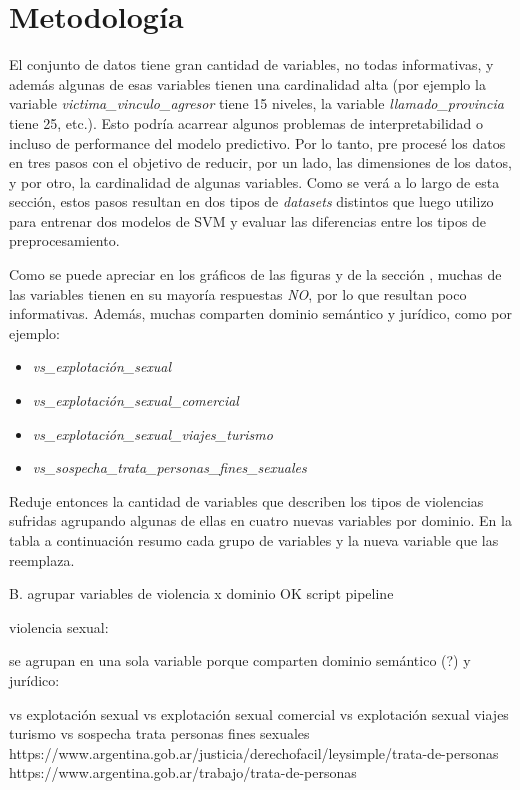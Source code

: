 \documentclass[10 pt]{article}
\begin{document}
\section*{Metodología}\label{met}

El conjunto de datos tiene gran cantidad de variables, no todas informativas, y además algunas de esas variables tienen una cardinalidad alta (por ejemplo la variable \textit{victima\_vinculo\_agresor} tiene 15 niveles, la variable \textit{llamado\_provincia} tiene 25, etc.). Esto podría acarrear algunos problemas de interpretabilidad o incluso de performance del modelo predictivo. Por lo tanto, pre procesé los datos en tres pasos con el objetivo de reducir, por un lado, las dimensiones de los datos, y por otro, la cardinalidad de algunas variables. Como se verá a lo largo de esta sección, estos pasos resultan en dos tipos de \textit{datasets} distintos que luego utilizo para entrenar dos modelos de SVM y evaluar las diferencias entre los tipos de preprocesamiento.

Como se puede apreciar en los gráficos de las figuras  y  de la sección , muchas de las variables tienen en su mayoría respuestas \textit{NO}, por lo que resultan poco informativas. Además, muchas comparten dominio semántico y jurídico, como por ejemplo:  
\begin{itemize}
\item \textit{vs\_explotación\_sexual}
\item \textit{vs\_explotación\_sexual\_comercial}
\item \textit{vs\_explotación\_sexual\_viajes\_turismo}
\item \textit{vs\_sospecha\_trata\_personas\_fines\_sexuales}
\end{itemize}

Reduje entonces la cantidad de variables que describen los tipos de violencias sufridas agrupando algunas de ellas en cuatro nuevas variables por dominio. En la tabla a continuación resumo cada grupo de variables y la nueva variable que las reemplaza. 

B. agrupar variables de violencia x dominio OK script pipeline 

violencia sexual:

se agrupan en una sola variable porque comparten dominio semántico (?) y jurídico:

vs explotación sexual
vs explotación sexual comercial
vs explotación sexual viajes turismo
vs sospecha trata personas fines sexuales
https://www.argentina.gob.ar/justicia/derechofacil/leysimple/trata-de-personas
https://www.argentina.gob.ar/trabajo/trata-de-personas
\end{document}
